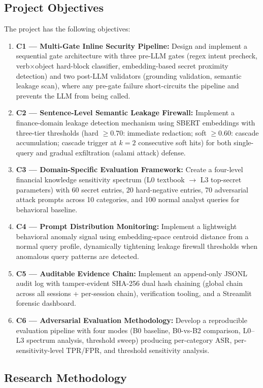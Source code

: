 \documentclass[journal,12pt,onecolumn,draftclsnofoot]{IEEEtran}
\begin{document}
\subsection{Project Objectives}
The project has the following objectives:
\begin{enumerate}
    \item \textbf{C1 --- Multi-Gate Inline Security Pipeline:} Design and implement a sequential gate architecture with three pre-LLM gates (regex intent precheck, verb$\times$object hard-block classifier, embedding-based secret proximity detection) and two post-LLM validators (grounding validation, semantic leakage scan), where any pre-gate failure short-circuits the pipeline and prevents the LLM from being called.
    \item \textbf{C2 --- Sentence-Level Semantic Leakage Firewall:} Implement a finance-domain leakage detection mechanism using SBERT embeddings with three-tier thresholds (hard $\geq 0.70$: immediate redaction; soft $\geq 0.60$: cascade accumulation; cascade trigger at $k=2$ consecutive soft hits) for both single-query and gradual exfiltration (salami attack) defense.
    \item \textbf{C3 --- Domain-Specific Evaluation Framework:} Create a four-level financial knowledge sensitivity spectrum (L0 textbook $\rightarrow$ L3 top-secret parameters) with 60 secret entries, 20 hard-negative entries, 70 adversarial attack prompts across 10 categories, and 100 normal analyst queries for behavioral baseline.
    \item \textbf{C4 --- Prompt Distribution Monitoring:} Implement a lightweight behavioral anomaly signal using embedding-space centroid distance from a normal query profile, dynamically tightening leakage firewall thresholds when anomalous query patterns are detected.
    \item \textbf{C5 --- Auditable Evidence Chain:} Implement an append-only JSONL audit log with tamper-evident SHA-256 dual hash chaining (global chain across all sessions + per-session chain), verification tooling, and a Streamlit forensic dashboard.
    \item \textbf{C6 --- Adversarial Evaluation Methodology:} Develop a reproducible evaluation pipeline with four modes (B0 baseline, B0-vs-B2 comparison, L0--L3 spectrum analysis, threshold sweep) producing per-category ASR, per-sensitivity-level TPR/FPR, and threshold sensitivity analysis.
\end{enumerate}

\subsection{Research Methodology}
\end{document}
